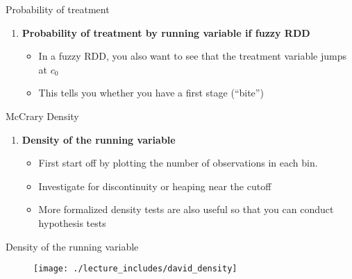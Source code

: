 \documentclass{beamer}
\begin{document}
\begin{frame}{Probability of treatment}
	
	\begin{enumerate}\addtocounter{enumi}{1}
	\item \textbf{Probability of treatment by running variable if fuzzy RDD}
		\begin{itemize}
		\item In a fuzzy RDD, you also want to see that the treatment variable jumps at $c_0$ 
		\item This tells you whether you have a first stage (``bite'')
		\end{itemize}
	\end{enumerate}
\end{frame}

\begin{frame}[plain]

			\begin{figure}
			\end{figure}

\end{frame}

\begin{frame}{McCrary Density}
	
	\begin{enumerate}\addtocounter{enumi}{2}
	\item \textbf{Density of the running variable}
		\begin{itemize}
		\item First start off by plotting the number of observations in each bin.
		\item Investigate for discontinuity or heaping near the cutoff
		\item More formalized density tests are also useful so that you can conduct hypothesis tests
		\end{itemize}
	\end{enumerate}
\end{frame}


\begin{frame}{Density of the running variable}
	
	\begin{figure}
	\texttt{[image: ./lecture\_includes/david\_density]}
	\end{figure}
	
\end{frame}
\end{document}
